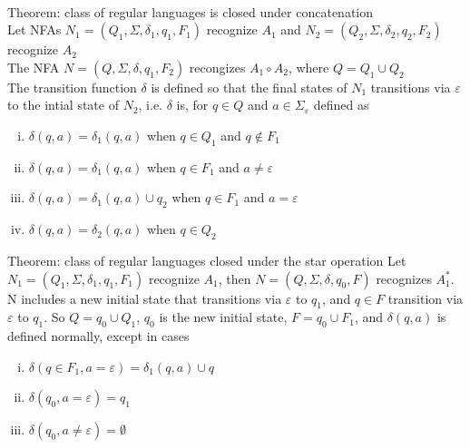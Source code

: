 \documentclass{article}
\newcommand*{\<}{\langle}
\renewcommand*{\>}{\rangle}
\begin{document}
			\\
			Theorem: class of regular languages is closed under concatenation \\
			Let NFAs $N_1 = (Q_1, \Sigma, \delta_1, q_1, F_1)$ recognize $A_1$ and $N_2 = (Q_2, \Sigma, \delta_2, q_2, F_2)$ recognize $A_2$ \\
			The NFA $N = (Q, \Sigma, \delta, q_1, F_2)$ recongizes $A_1 \circ A_2$, where $Q = Q_1 \cup Q_2$ \\
			The transition function $\delta$ is defined so that the final states of $N_1$ transitions via $\varepsilon$ to the intial state of $N_2$, i.e. $\delta$ is, for $q \in Q$ and $a \in \Sigma_\varepsilon$ defined as
			\begin{enumerate}[(i)]
				\item $\delta(q, a) = \delta_1(q, a)$ when $q \in Q_1$ and $q \notin F_1$
				\item $\delta(q, a) = \delta_1(q, a)$ when $q \in F_1$ and $a \neq \varepsilon$
				\item $\delta(q, a) = \delta_1(q, a) \cup {q_2}$ when $q \in F_1$ and $a = \varepsilon$
				\item $\delta(q, a) = \delta_2(q, a)$ when $q \in Q_2$
				\end{enumerate}
			Theorem: class of regular languages closed under the star operation
			Let $N_1 = (Q_1, \Sigma, \delta_1, q_1, F_1)$ recognize $A_1$, then $N = (Q, \Sigma, \delta, q_0, F)$ recognizes $A_1^*$. N includes a new initial state that transitions via $\varepsilon$ to $q_1$, and $q \in F$ transition via $\varepsilon$ to $q_1$. So $Q = {q_0} \cup Q_1$, $q_0$ is the new initial state, $F = {q_0} \cup F_1$, and $\delta(q, a)$ is defined normally, except in cases
			\begin{enumerate}[(i)]
				\item $\delta(q \in F_1, a = \varepsilon) = \delta_1(q, a) \cup {q}$
				\item $\delta(q_0, a = \varepsilon) = {q_1}$
				\item $\delta(q_0, a \neq \varepsilon) = \emptyset$
				\end{enumerate}
\end{document}

